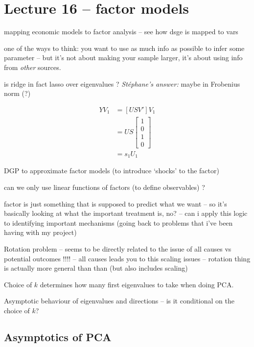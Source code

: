 \documentclass[a4paper,12pt,twoside]{article}
\begin{document}
\section*{Lecture 16 -- factor models}

mapping economic models to factor analysis -- see how dsge is mapped to vars

one of the ways to think: you want to use as much info as possible to infer some parameter -- but it's not about making your sample larger, it's about using info from \textit{other} sources.

is ridge in fact lasso over eigenvalues ? \textit{Stéphane's answer:} maybe in Frobenius norm (?)

\begin{equation}
	\begin{split}
		Y V_1 & =
		\left[ U S V' \right] V_1 \\ & =
		U S 
		\begin{bmatrix}
			1 \\
			0 \\
			1 \\
			0
		\end{bmatrix} \\ & =
		s_1 U_1
	\end{split}
\end{equation}

DGP to approximate factor models (to introduce `shocks' to the factor)

can we only use linear functions of factors (to define observables) ?

factor is just something that is supposed to predict what we want -- so it's basically looking at what the important treatment is, no? -- can i apply this logic to identifying important mechanisms (going back to problems that i've been having with my project)

Rotation problem -- seems to be directly related to the issue of all causes vs potential outcomes !!!! -- all causes leads you to this scaling issues -- rotation thing is actually more general than than (but also includes scaling)

Choice of $k$ determines how many first eigenvalues to take when doing PCA.

Asymptotic behaviour of eigenvalues and directions -- is it conditional on the choice of $k$?

\subsection*{Asymptotics of PCA}
\end{document}
